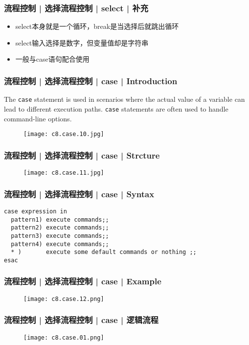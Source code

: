 \begin{frame}
  \frametitle{流程控制 | 选择流程控制 | select | 补充}
  \begin{itemize}
    \item select本身就是一个循环，break是当选择后就跳出循环
    \item select输入选择是数字，但变量值却是字符串
    \item 一般与case语句配合使用
  \end{itemize}
\end{frame}

\begin{frame}[fragile]
  \frametitle{流程控制 | 选择流程控制 | case | Introduction}
  The \verb|case| statement is used in scenarios where the actual value of a variable can lead to different execution paths. \verb|case| statements are often used to handle command-line options.
  \begin{figure}
    \centering
    \texttt{[image: c8.case.10.jpg]}
  \end{figure}
\end{frame}

\begin{frame}
  \frametitle{流程控制 | 选择流程控制 | case | Strcture}
  \begin{figure}
    \centering
    \texttt{[image: c8.case.11.jpg]}
  \end{figure}
\end{frame}

\begin{frame}[fragile]
  \frametitle{流程控制 | 选择流程控制 | case | Syntax}
\begin{lstlisting}
case expression in
  pattern1) execute commands;;
  pattern2) execute commands;;
  pattern3) execute commands;;
  pattern4) execute commands;;
  * )       execute some default commands or nothing ;;
esac
\end{lstlisting}
\end{frame}

\begin{frame}
  \frametitle{流程控制 | 选择流程控制 | case | Example}
  \begin{figure}
    \centering
    \texttt{[image: c8.case.12.png]}
  \end{figure}
\end{frame}

\begin{frame}
  \frametitle{流程控制 | 选择流程控制 | case | 逻辑流程}
  \begin{figure}
    \centering
    \texttt{[image: c8.case.01.png]}
  \end{figure}
\end{frame}

